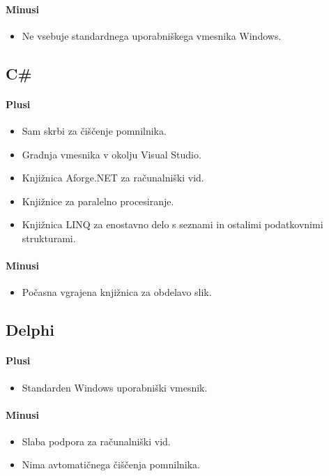 \documentclass[oneside, a4paper, 12pt]{book}
\begin{document}
\paragraph{Minusi}
\begin{itemize}
\item Ne vsebuje standardnega uporabniškega vmesnika Windows.
\end{itemize}

\subsection{C\#}
\paragraph{Plusi}
\begin{itemize}
\item Sam skrbi za čiščenje pomnilnika.
\item Gradnja vmesnika v okolju Visual Studio.
\item Knjižnica Aforge.NET za računalniški vid.
\item Knjižnice za paralelno procesiranje.
\item Knjižnica LINQ za enostavno delo s seznami in ostalimi podatkovnimi strukturami.
\end{itemize}
\paragraph{Minusi}
\begin{itemize}
\item Počasna vgrajena knjižnica za obdelavo slik.
\end{itemize}


\subsection{Delphi}
\paragraph{Plusi}
\begin{itemize}
\item Standarden Windows uporabniški vmesnik.
\end{itemize}
\paragraph{Minusi}
\begin{itemize}
\item Slaba podpora za računalniški vid.
\item Nima avtomatičnega čiščenja pomnilnika.
\end{itemize}
\end{document}
